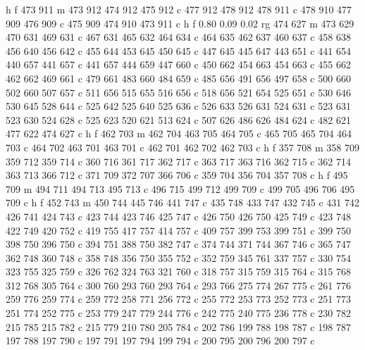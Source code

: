 {{        h f
        473 911 m
        473 912 474 912 475 912 c
        477 912 478 912 478 911 c
        478 910 477 909 476 909 c
        475 909 474 910 473 911 c
        h f
        0.80 0.09 0.02 rg
        474 627 m
        473 629 470 631 469 631 c
        467 631 465 632 464 634 c
        464 635 462 637 460 637 c
        458 638 456 640 456 642 c
        455 644 453 645 450 645 c
        447 645 445 647 443 651 c
        441 654 440 657 441 657 c
        441 657 444 659 447 660 c
        450 662 454 663 454 663 c
        455 662 462 662 469 661 c
        479 661 483 660 484 659 c
        485 656 491 656 497 658 c
        500 660 502 660 507 657 c
        511 656 515 655 516 656 c
        518 656 521 654 525 651 c
        530 646 530 645 528 644 c
        525 642 525 640 525 636 c
        526 633 526 631 524 631 c
        523 631 523 630 524 628 c
        525 623 520 621 513 624 c
        507 626 486 626 484 624 c
        482 621 477 622 474 627 c
        h f
        462 703 m
        462 704 463 705 464 705 c
        465 705 465 704 464 703 c
        464 702 463 701 463 701 c
        462 701 462 702 462 703 c
        h f
        357 708 m
        358 709 359 712 359 714 c
        360 716 361 717 362 717 c
        363 717 363 716 362 715 c
        362 714 363 713 366 712 c
        371 709 372 707 366 706 c
        359 704 356 704 357 708 c
        h f
        495 709 m
        494 711 494 713 495 713 c
        496 715 499 712 499 709 c
        499 705 496 706 495 709 c
        h f
        452 743 m
        450 744 445 746 441 747 c
        435 748 433 747 432 745 c
        431 742 426 741 424 743 c
        423 744 423 746 425 747 c
        426 750 426 750 425 749 c
        423 748 422 749 420 752 c
        419 755 417 757 414 757 c
        409 757 399 753 399 751 c
        399 750 398 750 396 750 c
        394 751 388 750 382 747 c
        374 744 371 744 367 746 c
        365 747 362 748 360 748 c
        358 748 356 750 355 752 c
        352 759 345 761 337 757 c
        330 754 323 755 325 759 c
        326 762 324 763 321 760 c
        318 757 315 759 315 764 c
        315 768 312 768 305 764 c
        300 760 293 760 293 764 c
        293 766 275 774 267 775 c
        261 776 259 776 259 774 c
        259 772 258 771 256 772 c
        255 772 253 773 252 773 c
        251 773 251 774 252 775 c
        253 779 247 779 244 776 c
        242 775 240 775 236 778 c
        230 782 215 785 215 782 c
        215 779 210 780 205 784 c
        202 786 199 788 198 787 c
        198 787 197 788 197 790 c
        197 791 197 794 199 794 c
        200 795 200 796 200 797 c
}}
